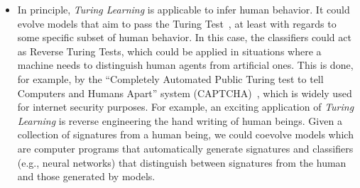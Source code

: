 \begin{itemize}
\item In principle, \textit{Turing Learning} is applicable to infer human behavior. It could evolve models that aim to pass the Turing Test~\citep{Turing1950}, at least with regards to some specific subset of human behavior. In this case, the classifiers could act as Reverse Turing Tests, which could be applied in situations where a machine needs to distinguish human agents from artificial ones. This is done, for example, by the ``Completely Automated Public Turing test to tell Computers and Humans Apart'' system (CAPTCHA)~\citep{captcha2008}, which is widely used for internet security purposes. For example, an exciting application of \textit{Turing Learning} is reverse engineering the hand writing of human beings. Given a collection of signatures from a human being, we could coevolve models which are computer programs that automatically generate signatures and classifiers (e.g., neural networks) that distinguish between signatures from the human and those generated by models. 

\end{itemize}

